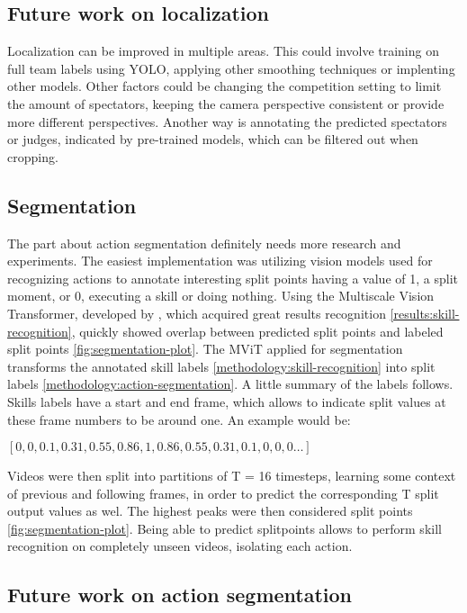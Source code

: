 \subsection{Future work on localization}

Localization can be improved in multiple areas. This could involve training on full team labels using YOLO, applying other smoothing techniques or implenting other models. Other factors could be changing the competition setting to limit the amount of spectators, keeping the camera perspective consistent or provide more different perspectives. Another way is annotating the predicted spectators or judges, indicated by pre-trained models, which can be filtered out when cropping.

\subsection{Segmentation}

The part about action segmentation definitely needs more research and experiments. The easiest implementation was utilizing vision models used for recognizing actions to annotate interesting split points having a value of 1, a split moment, or 0, executing a skill or doing nothing. Using the Multiscale Vision Transformer, developed by \autocite{Fan2021}, which acquired great results recognition \ref{results:skill-recognition}, quickly showed overlap between predicted split points and labeled split points \ref{fig:segmentation-plot}.
The MViT applied for segmentation transforms the annotated skill labels \ref{methodology:skill-recognition} into split labels \ref{methodology:action-segmentation}. A little summary of the labels follows. Skills labels have a start and end frame, which allows to indicate split values at these frame numbers to be around one. An example would be:

\(
[0, 0, 0.1, 0.31, 0.55, 0.86, 1, 0.86, 0.55, 0.31, 0.1, 0, 0, 0 \dots]
\)

Videos were then split into partitions of T = 16 timesteps, learning some context of previous and following frames, in order to predict the corresponding T split output values as wel. The highest peaks were then considered split points \ref{fig:segmentation-plot}.
Being able to predict splitpoints allows to perform skill recognition on completely unseen videos, isolating each action.

\subsection{Future work on action segmentation}

